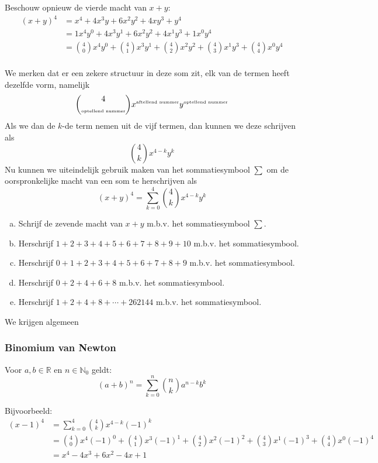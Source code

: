 \documentclass[12pt,a4paper,twoside]{article}
\begin{document}
Beschouw opnieuw de vierde macht van $x+y$:
\begin{align*}
  (x+y)^4 &= x^4 + 4x^3y+6x^2y^2+4xy^3+y^4\\
          &= 1x^4y^0 + 4x^3y^1+6x^2y^2+4x^1y^3+1x^0y^4\\
          &= {4 \choose 0}x^4y^0 + {4 \choose 1}x^3y^1+{4 \choose 2}x^2y^2+{4 \choose 3}x^1y^3+{4 \choose 4}x^0y^4\\
\end{align*}

We merken dat er een zekere structuur in deze som zit, elk van de termen heeft dezelfde vorm, namelijk
\[{4 \choose \mbox{\tiny{optellend nummer}}}x^{\mbox{{\tiny aftellend nummer}}}y^{\mbox{{\tiny optellend nummer}}}\]
Als we dan de $k$-de term nemen uit de vijf termen, dan kunnen we deze schrijven als
\[{4 \choose k}x^{4-k}y^{k}\]
Nu kunnen we uiteindelijk gebruik maken van het sommatiesymbool $\sum$ om de oorspronkelijke macht van een som te herschrijven als
\[\left(x+y\right)^4 = \sum^4_{k=0}{4 \choose k}x^{4-k}y^{k}\]

\begin{oefening}
\begin{enumerate}[(a)]
\item Schrijf de zevende macht van $x+y$ m.b.v. het sommatiesymbool
  $\sum$.
\item Herschrijf $1 + 2 + 3 + 4 + 5 + 6 + 7 + 8 + 9 + 10$ m.b.v. het sommatiesymbool.
\item Herschrijf $0 + 1 + 2 + 3 + 4 + 5 + 6 + 7 + 8 + 9$ m.b.v. het sommatiesymbool.
\item Herschrijf $0 + 2 + 4 + 6 + 8$ m.b.v. het sommatiesymbool.
\item Herschrijf $1 + 2 + 4 + 8 + \cdots + 262144$ m.b.v. het sommatiesymbool.
\end{enumerate}
\end{oefening}

\needspace{5cm}
We krijgen algemeen
\subsubsection*{Binomium van Newton}
\begin{mdframed}
Voor $a,b\in\mathbb{R}$ en $n\in\mathbb{N}_0$ geldt:
$$(a+b)^n=\sum^n_{k=0}{n \choose k}a^{n-k}b^k$$
\end{mdframed}

Bijvoorbeeld:
\begin{align*}\displaystyle
  (x-1)^4 &= \sum^4_{k=0}{4 \choose k}x^{4-k}(-1)^k\\
          &= {4 \choose 0}x^4(-1)^0 + {4 \choose 1}x^3(-1)^1+{4 \choose 2}x^2(-1)^2+{4 \choose 3}x^1(-1)^3+{4 \choose 4}x^0(-1)^4\\
          &=x^4-4x^3+6x^2-4x+1
\end{align*}
\end{document}
